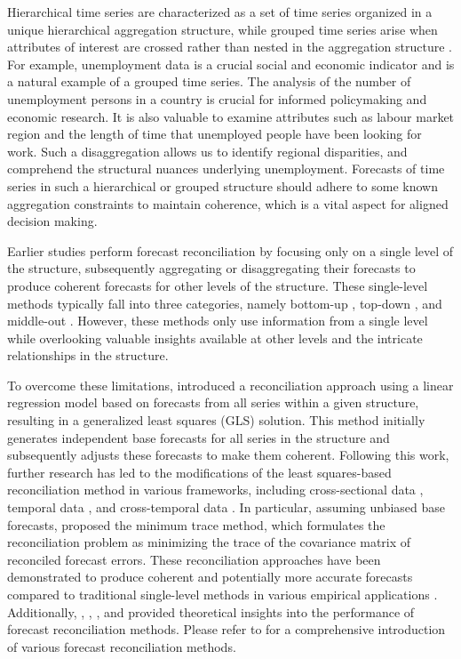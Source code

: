 \documentclass[11pt,a4paper,]{article}
\begin{document}
Hierarchical time series are characterized as a set of time series
organized in a unique hierarchical aggregation structure, while grouped
time series arise when attributes of interest are crossed rather than
nested in the aggregation structure \autocite{Hyndman2016-cz}. For
example, unemployment data is a crucial social and economic indicator
and is a natural example of a grouped time series. The analysis of the
number of unemployment persons in a country is crucial for informed
policymaking and economic research. It is also valuable to examine
attributes such as labour market region and the length of time that
unemployed people have been looking for work. Such a disaggregation
allows us to identify regional disparities, and comprehend the
structural nuances underlying unemployment. Forecasts of time series in
such a hierarchical or grouped structure should adhere to some known
aggregation constraints to maintain coherence, which is a vital aspect
for aligned decision making.

Earlier studies perform forecast reconciliation by focusing only on a
single level of the structure, subsequently aggregating or
disaggregating their forecasts to produce coherent forecasts for other
levels of the structure. These single-level methods typically fall into
three categories, namely bottom-up \autocite{Dunn1976-op}, top-down
\autocite{Gross1990-lg}, and middle-out
\autocite{Athanasopoulos2009-ps}. However, these methods only use
information from a single level while overlooking valuable insights
available at other levels and the intricate relationships in the
structure.

To overcome these limitations, \textcite{Hyndman2011-sd} introduced a
reconciliation approach using a linear regression model based on
forecasts from all series within a given structure, resulting in a
generalized least squares (GLS) solution. This method initially
generates independent base forecasts for all series in the structure and
subsequently adjusts these forecasts to make them coherent. Following
this work, further research has led to the modifications of the least
squares-based reconciliation method in various frameworks, including
cross-sectional data
\autocite{Hyndman2016-cz,Wickramasuriya2019-fc,Panagiotelis2021-mf},
temporal data \autocite{Athanasopoulos2017-jj,Nystrup2020-di}, and
cross-temporal data \autocite{Di_Fonzo2023-vo}. In particular, assuming
unbiased base forecasts, \textcite{Wickramasuriya2019-fc} proposed the
minimum trace method, which formulates the reconciliation problem as
minimizing the trace of the covariance matrix of reconciled forecast
errors. These reconciliation approaches have been demonstrated to
produce coherent and potentially more accurate forecasts compared to
traditional single-level methods in various empirical applications
\autocites[see, for
example,][]{Taieb2021-tc,Panagiotelis2021-mf,Wickramasuriya2023-hn}.
Additionally, \textcite{Van_Erven2015-ir},
\textcite{Wickramasuriya2019-fc}, \textcite{Panagiotelis2021-mf}, and
\textcite{Wickramasuriya2021-am} provided theoretical insights into the
performance of forecast reconciliation methods. Please refer to
\textcite{Athanasopoulos2023-sm} for a comprehensive introduction of
various forecast reconciliation methods.
\end{document}
